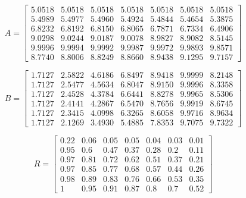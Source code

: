 \small
\begin{equation*}
    A = 
    \begin{bmatrix}
        5.0518 & 5.0518 & 5.0518 & 5.0518 & 5.0518 & 5.0518 & 5.0518 \\
        5.4989 & 5.4977 & 5.4960 & 5.4924 & 5.4844 & 5.4654 & 5.3875 \\
        6.8232 & 6.8192 & 6.8150 & 6.8065 & 6.7871 & 6.7334 & 6.4906 \\
        9.0298 & 9.0244 & 9.0187 & 9.0078 & 8.9827 & 8.9082 & 8.5145 \\
        9.9996 & 9.9994 & 9.9992 & 9.9987 & 9.9972 & 9.9893 & 9.8571 \\
        8.7740 & 8.8006 & 8.8249 & 8.8660 & 8.9438 & 9.1295 & 9.7157
    \end{bmatrix}
\end{equation*}

\begin{equation*}
    B = 
    \begin{bmatrix}
        1.7127 & 2.5822 & 4.6186 & 6.8497 & 8.9418 & 9.9999 & 8.2148 \\
        1.7127 & 2.5477 & 4.5634 & 6.8047 & 8.9150 & 9.9996 & 8.3358 \\
        1.7127 & 2.4528 & 4.3784 & 6.6441 & 8.8278 & 9.9965 & 8.5306 \\
        1.7127 & 2.4141 & 4.2867 & 6.5470 & 8.7656 & 9.9919 & 8.6745 \\
        1.7127 & 2.3415 & 4.0998 & 6.3265 & 8.6058 & 9.9716 & 8.9634 \\
        1.7127 & 2.1269 & 3.4930 & 5.4885 & 7.8353 & 9.7075 & 9.7322
    \end{bmatrix}
\end{equation*}

\begin{equation}\label{eq:affine_transformation_payoff_matrices}
    R = 
    \begin{bmatrix}
        0.22 & 0.06 & 0.05 & 0.05 & 0.04 & 0.03 & 0.01 \\
        0.95 & 0.6  & 0.47 & 0.37 & 0.28 & 0.2  & 0.11 \\
        0.97 & 0.81 & 0.72 & 0.62 & 0.51 & 0.37 & 0.21 \\
        0.97 & 0.85 & 0.77 & 0.68 & 0.57 & 0.44 & 0.26 \\
        0.98 & 0.89 & 0.83 & 0.76 & 0.66 & 0.53 & 0.35 \\
        1    & 0.95 & 0.91 & 0.87 & 0.8  & 0.7  & 0.52
    \end{bmatrix}
\end{equation}
\normalsize

